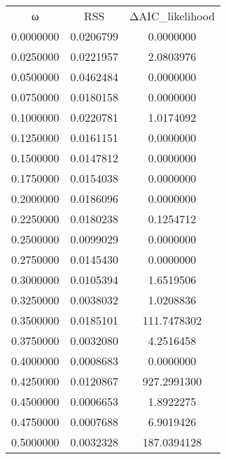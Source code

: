 \begin{tabular}{ccc}
ω & RSS & ΔAIC_likelihood\\
0.0000000 & 0.0206799 & 0.0000000\\
0.0250000 & 0.0221957 & 2.0803976\\
0.0500000 & 0.0462484 & 0.0000000\\
0.0750000 & 0.0180158 & 0.0000000\\
0.1000000 & 0.0220781 & 1.0174092\\
0.1250000 & 0.0161151 & 0.0000000\\
0.1500000 & 0.0147812 & 0.0000000\\
0.1750000 & 0.0154038 & 0.0000000\\
0.2000000 & 0.0186096 & 0.0000000\\
0.2250000 & 0.0180238 & 0.1254712\\
0.2500000 & 0.0099029 & 0.0000000\\
0.2750000 & 0.0145430 & 0.0000000\\
0.3000000 & 0.0105394 & 1.6519506\\
0.3250000 & 0.0038032 & 1.0208836\\
0.3500000 & 0.0185101 & 111.7478302\\
0.3750000 & 0.0032080 & 4.2516458\\
0.4000000 & 0.0008683 & 0.0000000\\
0.4250000 & 0.0120867 & 927.2991300\\
0.4500000 & 0.0006653 & 1.8922275\\
0.4750000 & 0.0007688 & 6.9019426\\
0.5000000 & 0.0032328 & 187.0394128\\
\end{tabular}

